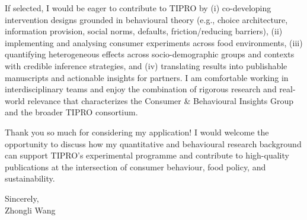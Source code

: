 \documentclass[11pt]{article}
\begin{document}
\bigskip

If selected, I would be eager to contribute to TIPRO by (i) co-developing intervention designs grounded in behavioural theory (e.g., choice architecture, information provision, social norms, defaults, friction/reducing barriers), (ii) implementing and analysing consumer experiments across food environments, (iii) quantifying heterogeneous effects across socio-demographic groups and contexts with credible inference strategies, and (iv) translating results into publishable manuscripts and actionable insights for partners. I am comfortable working in interdisciplinary teams and enjoy the combination of rigorous research and real-world relevance that characterizes the Consumer \& Behavioural Insights Group and the broader TIPRO consortium.

\bigskip

Thank you so much for considering my application! I would welcome the opportunity to discuss how my quantitative and behavioural research background can support TIPRO’s experimental programme and contribute to high-quality publications at the intersection of consumer behaviour, food policy, and sustainability.

\vspace{6mm}

\noindent Sincerely,\\[12mm]
\noindent Zhongli Wang
\end{document}
